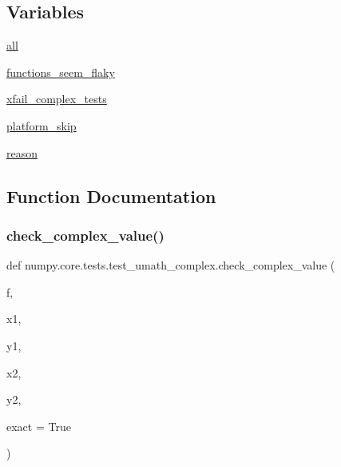 \subsection*{Variables}
\begin{DoxyCompactItemize}
\item 
\hyperlink{namespacenumpy_1_1core_1_1tests_1_1test__umath__complex_a8747f71efabb578e4921ee85ba986df4}{all}
\item 
\hyperlink{namespacenumpy_1_1core_1_1tests_1_1test__umath__complex_afac06924308019519e3fd900d17cd2eb}{functions\+\_\+seem\+\_\+flaky}
\item 
\hyperlink{namespacenumpy_1_1core_1_1tests_1_1test__umath__complex_a98fe4ac5b3da5a15528e9136dc29efa1}{xfail\+\_\+complex\+\_\+tests}
\item 
\hyperlink{namespacenumpy_1_1core_1_1tests_1_1test__umath__complex_a26165526da78d34b20d2f1412a51d0d8}{platform\+\_\+skip}
\item 
\hyperlink{namespacenumpy_1_1core_1_1tests_1_1test__umath__complex_a2de0db6b2400a68398169a102b8df008}{reason}
\end{DoxyCompactItemize}


\subsection{Function Documentation}
\mbox{\label{namespacenumpy_1_1core_1_1tests_1_1test__umath__complex_a7d7711cca42ae62691c2526497d66c52}} 
\subsubsection{\texorpdfstring{check\+\_\+complex\+\_\+value()}{check\_complex\_value()}}
{\footnotesize\ttfamily def numpy.\+core.\+tests.\+test\+\_\+umath\+\_\+complex.\+check\+\_\+complex\+\_\+value (\begin{DoxyParamCaption}\item[{}]{f,  }\item[{}]{x1,  }\item[{}]{y1,  }\item[{}]{x2,  }\item[{}]{y2,  }\item[{}]{exact = {\ttfamily True} }\end{DoxyParamCaption})}

